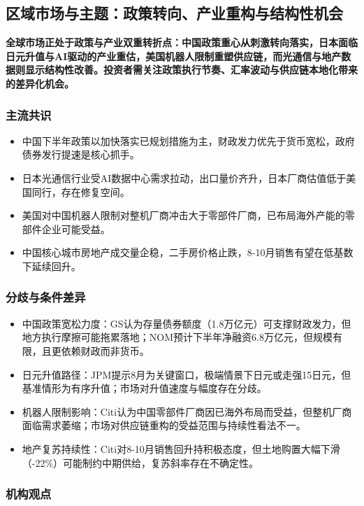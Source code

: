 \documentclass[11pt]{ctexart}
\begin{document}
\subsection{区域市场与主题：政策转向、产业重构与结构性机会}
\textbf{全球市场正处于政策与产业双重转折点：中国政策重心从刺激转向落实，日本面临日元升值与AI驱动的产业重估，美国机器人限制重塑供应链，而光通信与地产数据则显示结构性改善。投资者需关注政策执行节奏、汇率波动与供应链本地化带来的差异化机会。}
\subsubsection*{主流共识}
\begin{itemize}
  \item 中国下半年政策以加快落实已规划措施为主，财政发力优先于货币宽松，政府债券发行提速是核心抓手。
  \item 日本光通信行业受AI数据中心需求拉动，出口量价齐升，日本厂商估值低于美国同行，存在修复空间。
  \item 美国对中国机器人限制对整机厂商冲击大于零部件厂商，已布局海外产能的零部件企业可能受益。
  \item 中国核心城市房地产成交量企稳，二手房价格止跌，8-10月销售有望在低基数下延续回升。
\end{itemize}
\subsubsection*{分歧与条件差异}
\begin{itemize}
  \item 中国政策宽松力度：GS认为存量债券额度（1.8万亿元）可支撑财政发力，但地方执行摩擦可能拖累落地；NOM预计下半年净融资6.8万亿元，但规模有限，且更依赖财政而非货币。
  \item 日元升值路径：JPM提示8月为关键窗口，极端情景下日元或走强15日元，但基准情形为有序升值；市场对升值速度与幅度存在分歧。
  \item 机器人限制影响：Citi认为中国零部件厂商因已海外布局而受益，但整机厂商面临需求萎缩；市场对供应链重构的受益范围与持续性看法不一。
  \item 地产复苏持续性：Citi对8-10月销售回升持积极态度，但土地购置大幅下滑（-22\%）可能制约中期供给，复苏斜率存在不确定性。
\end{itemize}
\subsubsection*{机构观点}
\end{document}
